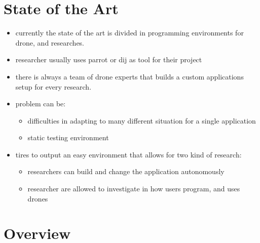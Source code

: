 \section{State of the Art}
\label{sec:intro_soa}
\begin{itemize}
    \item currently the state of the art is divided in programming environments for drone, and \hdi researches.
    \item \hdi researcher usually uses parrot or dij as tool for their project
    \item there is always a team of drone experts that builds a custom applications setup for every \hdi research.
    \item problem can be:
    \begin{itemize}
        \item difficulties in adapting to many different situation for a single application
        \item static testing environment
    \end{itemize}
    \item \easyfly{} tires to output an easy environment that allows for two kind of research:
        \begin{itemize}
            \item researchers can build and change the application autonomously
            \item researcher are allowed to investigate in how users program, and uses drones  
        \end{itemize}
\end{itemize}



\section{Overview}
\label{sec:intro_overview}